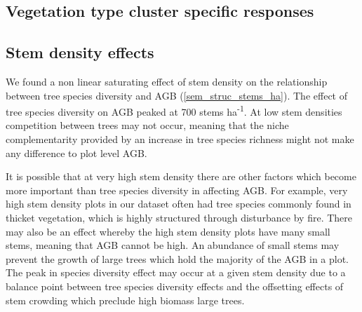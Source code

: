 \documentclass[11pt,a4paper]{article}
\begin{document}
\subsection{Vegetation type cluster specific responses}


\subsection{Stem density effects}

We found a non linear saturating effect of stem density on the relationship between tree species diversity and AGB (\autoref{sem_struc_stems_ha}). The effect of tree species diversity on AGB peaked at \textapprox{}700 stems ha\textsuperscript{-1}. At low stem densities competition between trees may not occur, meaning that the niche complementarity provided by an increase in tree species richness might not make any difference to plot level AGB.

It is possible that at very high stem density there are other factors which become more important than tree species diversity in affecting AGB. For example, very high stem density plots in our dataset often had tree species commonly found in thicket vegetation, which is highly structured through disturbance by fire. There may also be an effect whereby the high stem density plots have many small stems, meaning that AGB cannot be high. An abundance of small stems may prevent the growth of large trees which hold the majority of the AGB in a plot. The peak in species diversity effect may occur at a given stem density due to a balance point between tree species diversity effects and the offsetting effects of stem crowding which preclude high biomass large trees.





\end{document}
